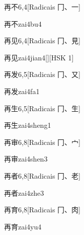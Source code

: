 \begin{entry}{再不}{6,4}[Radicais ⼌、⼀]
  \begin{phonetics}{再不}{zai4bu4}
  \end{phonetics}
\end{entry}

\begin{entry}{再见}{6,4}[Radicais ⼌、⾒]
  \begin{phonetics}{再见}{zai4jian4}[][HSK 1]
  \end{phonetics}
\end{entry}

\begin{entry}{再发}{6,5}[Radicais ⼌、⼜]
  \begin{phonetics}{再发}{zai4fa1}
  \end{phonetics}
\end{entry}

\begin{entry}{再生}{6,5}[Radicais ⼌、⽣]
  \begin{phonetics}{再生}{zai4sheng1}
  \end{phonetics}
\end{entry}

\begin{entry}{再审}{6,8}[Radicais ⼌、⼧]
  \begin{phonetics}{再审}{zai4shen3}
  \end{phonetics}
\end{entry}

\begin{entry}{再者}{6,8}[Radicais ⼌、⽼]
  \begin{phonetics}{再者}{zai4zhe3}
  \end{phonetics}
\end{entry}

\begin{entry}{再育}{6,8}[Radicais ⼌、⾁]
  \begin{phonetics}{再育}{zai4yu4}
  \end{phonetics}
\end{entry}


